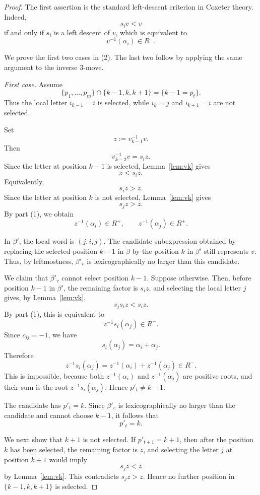 \documentclass[12pt, reqno]{amsart}
\theoremstyle{plain}
\theoremstyle{definition}
\numberwithin{equation}{section}
\begin{document}
\begin{proof}
The first assertion is the standard left-descent criterion in Coxeter theory.
Indeed,
\[
s_i v<v
\]
if and only if \(s_i\) is a left descent of \(v\), which is equivalent to
\[
v^{-1}(\alpha_i)\in R^-.
\]

We prove the first two cases in (2). The last two follow by applying the same
argument to the inverse \(3\)-move.

\medskip
\noindent
\emph{First case.}
Assume
\[
\{p_1,\dots,p_m\}\cap\{k-1,k,k+1\}
=
\{k-1=p_t\}.
\]
Thus the local letter \(i_{k-1}=i\) is selected, while \(i_k=j\) and
\(i_{k+1}=i\) are not selected.

Set
\[
z:=v_{k-1}^{-1}v.
\]
Then
\[
v_{k-2}^{-1}v=s_i z.
\]
Since the letter at position \(k-1\) is selected, Lemma~\ref{lem:vk} gives
\[
z<s_i z.
\]
Equivalently,
\[
s_i z>z.
\]
Since the letter at position \(k\) is not selected, Lemma~\ref{lem:vk} gives
\[
s_j z>z.
\]
By part (1), we obtain
\[
z^{-1}(\alpha_i)\in R^+,
\qquad
z^{-1}(\alpha_j)\in R^+.
\]

In \(\beta'\), the local word is \((j,i,j)\). The candidate subexpression
obtained by replacing the selected position \(k-1\) in \(\beta\) by the
position \(k\) in \(\beta'\) still represents \(v\). Thus, by leftmostness,
\(\beta'_v\) is lexicographically no larger than this candidate.

We claim that \(\beta'_v\) cannot select position \(k-1\). Suppose otherwise.
Then, before position \(k-1\) in \(\beta'\), the remaining factor is \(s_i z\),
and selecting the local letter \(j\) gives, by Lemma~\ref{lem:vk},
\[
s_js_i z<s_i z.
\]
By part (1), this is equivalent to
\[
z^{-1}s_i(\alpha_j)\in R^-.
\]
Since \(c_{ij}=-1\), we have
\[
s_i(\alpha_j)=\alpha_i+\alpha_j.
\]
Therefore
\[
z^{-1}s_i(\alpha_j)
=
z^{-1}(\alpha_i)+z^{-1}(\alpha_j)\in R^-.
\]
This is impossible, because both \(z^{-1}(\alpha_i)\) and
\(z^{-1}(\alpha_j)\) are positive roots, and their sum is the root
\(z^{-1}s_i(\alpha_j)\). Hence \(p'_t\neq k-1\).

The candidate has \(p'_t=k\). Since \(\beta'_v\) is lexicographically no larger
than the candidate and cannot choose \(k-1\), it follows that
\[
p'_t=k.
\]

We next show that \(k+1\) is not selected. If \(p'_{t+1}=k+1\), then after the
position \(k\) has been selected, the remaining factor is \(z\), and selecting
the letter \(j\) at position \(k+1\) would imply
\[
s_jz<z
\]
by Lemma~\ref{lem:vk}. This contradicts \(s_jz>z\). Hence no further position
in \(\{k-1,k,k+1\}\) is selected.


\end{proof}
\end{document}
